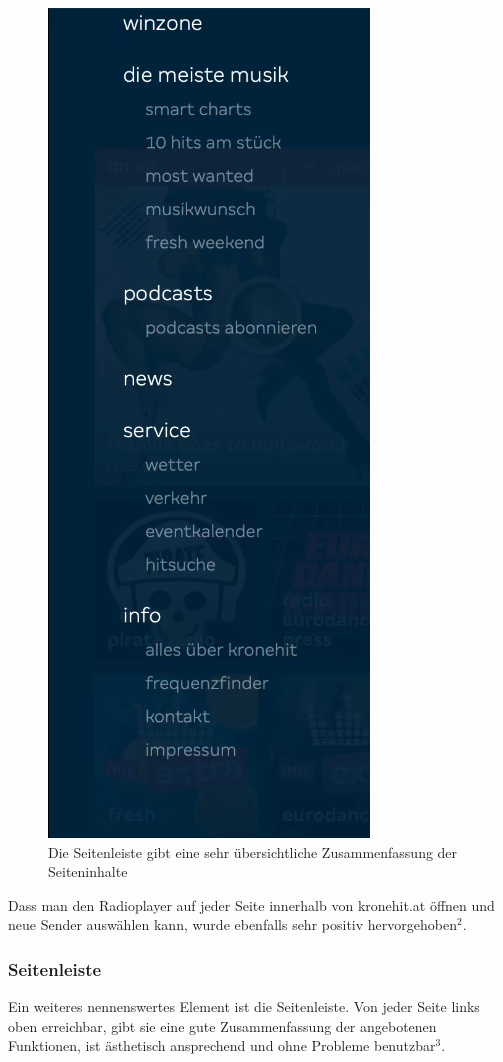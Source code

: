 \documentclass{article}
\begin{document}
	\begin{figure}
		\begin{center}
			\includegraphics[scale=0.5]{Bilder/p03-ah-sidebar.png}
			\caption{Die Seitenleiste gibt eine sehr übersichtliche Zusammenfassung der Seiteninhalte}
		\end{center}
	\end{figure}
	Dass man den Radioplayer auf jeder Seite innerhalb von kronehit.at öffnen und neue Sender auswählen kann, wurde ebenfalls sehr positiv hervorgehoben\hyperref[sec:Anhang2]{$^2$}\label{ssub:radioplayer2}. \\
	\subsubsection{Seitenleiste}
	Ein weiteres nennenswertes Element ist die Seitenleiste. Von jeder Seite links oben erreichbar, gibt sie eine gute Zusammenfassung der angebotenen Funktionen, ist ästhetisch ansprechend und ohne Probleme benutzbar\hyperref[sec:Anhang3]{$^3$}\label{ssub:sidebar}.
	\clearpage
	\newpage
\end{document}
